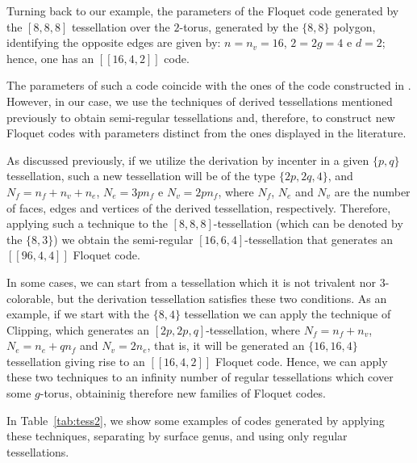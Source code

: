 \documentclass[%
reprint,
amsmath,amssymb,
aps,
]{revtex4-2}
\begin{document}
Turning back to our example, the parameters of the Floquet code generated by the $[8,8,8]$ tessellation over the $2$-torus, generated by the $\{8,8\}$ polygon, identifying the opposite edges \cite{katok} are given by: $n=n_v=16$, $2=2g=4$ e $d=2$; hence, one has an $[[16,4,2]]$ code.

The parameters of such a code coincide with the ones of the code constructed in \cite{Breuckmann2024}. However, in our case, we use the techniques of derived tessellations mentioned previously to obtain semi-regular tessellations and, therefore, to construct new Floquet codes with parameters distinct from the ones displayed in the literature.

As discussed previously, if we utilize the derivation by incenter in a given $\{p,q\}$ tessellation, such a new tessellation will be of the type $\{2p,2q,4\}$, and $N_f = n_f+n_v+n_e$, $N_e = 3p n_f$ e $N_v = 2p n_f$, where $N_f$, $N_e$ and $N_v$ are the number of faces, edges and vertices of the derived tessellation, respectively. Therefore, applying such a technique to the $[8,8,8]$-tessellation (which can be denoted by the $\{8,3\}$) we obtain the semi-regular $[16,6,4]$-tessellation that generates an $[[96,4,4]]$ Floquet code.

In some cases, we can start from a tessellation which it is not trivalent nor $3$-colorable, but the derivation tessellation satisfies these two conditions. As an example, if we start with the $\{8,4\}$ tessellation we can apply the technique of Clipping, which generates an $[2p,2p,q]$-tessellation, where $N_f = n_f+n_v$, $N_e = n_e+q n_f$ and $N_v = 2 n_e$, that is, it will be generated an $\{16, 16, 4\}$ tessellation giving rise to an $[[16,4,2]]$ Floquet code. Hence, we can apply 
these two techniques to an infinity number of regular tessellations which cover some
$g$-torus, obtaininig therefore new families of Floquet codes.

In Table~\ref{tab:tess2}, we show some examples of codes generated by applying these techniques, 
separating by surface genus, and using only regular tessellations.
\end{document}
